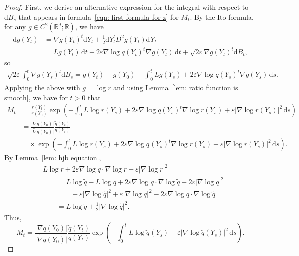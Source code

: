 \documentclass[reqno]{amsart}
\newcommand{\Real}{\mathbb{R}}
\newcommand{\eps}{\varepsilon}
\newcommand{\1}{\mathds{1}}
\renewcommand{\d}{\mathrm{d}}
\newcommand{\grad}{\nabla}
\renewcommand{\L}{L}
\newcommand{\zed}{M}
\theoremstyle{definition}
\theoremstyle{remark}
\begin{document}
\begin{proof}
  First, we derive an alternative expression for the integral with respect to $\d B_s$ that appears in formula~\eqref{eqn: first formula for z} for $\zed_t$.  By the Ito formula, for any $g \in C^2(\Real^d ; \Real)$, we have
  \begin{align*}
    \d g(Y_t) &= \grad g(Y_t)^t \d Y_t + \frac12 \d Y_t^t D^2g(Y_t) \d Y_t \\
              &= \L g (Y_t) \, \d t + 2 \eps \grad \log q(Y_t)^t \grad g(Y_t) \, \d t +  \sqrt{2 \eps}\grad g(Y_t)^t \d B_t,
  \end{align*}
  so
  \begin{align*}
    \sqrt{2 \eps} \int_0^t \grad g(Y_s)^t \d B_s = g(Y_t) - g(Y_0) - \int_0^t   \L g (Y_s) + 2 \eps \grad \log q(Y_s)^t \grad g(Y_s) \, \d s.
  \end{align*}
  Applying the above with $g = \log r$ and using Lemma~\ref{lem: ratio function is smooth}, we have for $t >0$ that 
  \begin{align*}
    \zed_t &= \frac{r(Y_t)}{r(Y_0)} \exp \left (-\int_0^t  \L \log r(Y_s) + 2 \eps \grad \log q(Y_s)^t  \grad \log r(Y_s) + \eps \lvert \grad \log r(Y_s) \rvert^2 \, \d s  \right ) \\
    &= \frac{\lvert \grad  q (Y_0) \rvert}{\lvert  \tilde \grad q (Y_0) \rvert} \frac{\tilde q(Y_t)}{q(Y_t)} \\
    &\quad \times
           \exp \left (-\int_0^t  \L \log r(Y_s) + 2 \eps \grad \log q(Y_s)^t  \grad \log r(Y_s) + \eps \lvert \grad \log r(Y_s) \rvert^2 \, \d s  \right ). 
  \end{align*}
  By Lemma~\ref{lem: hjb equation},
  \begin{align*}
    &\L \log r + 2 \eps \grad \log q \cdot \grad \log r + \eps \lvert \grad \log r \rvert^2 \\
    &\qquad = \L \log \tilde q - \L \log q + 2 \eps \grad  \log q \cdot \grad \log \tilde q - 2 \eps \lvert \grad \log q \rvert^2 \\
    &\qquad \qquad+ \eps \lvert \grad \log \tilde q \rvert^2 + \eps \lvert \grad \log q \rvert^2 - 2 \eps \grad  \log q \cdot \grad \log \tilde q \\
    &\qquad = \L \log \tilde q + \frac12 \lvert \grad \log \tilde q \rvert^2.
  \end{align*}
  Thus, 
  \begin{equation*}\label{eq: first formula for zxt}
    \zed_t= \frac{\lvert \grad  q (Y_0) \rvert}{\lvert  \tilde \grad q (Y_0) \rvert} \frac{\tilde q(Y_t)}{q(Y_t)} \exp \left (-\int_0^t  \L \log \tilde q (Y_s)  + \eps \lvert \grad \log \tilde q(Y_s) \rvert^2 \, \d s  \right ).

\end{equation*}
\end{proof}
\end{document}
